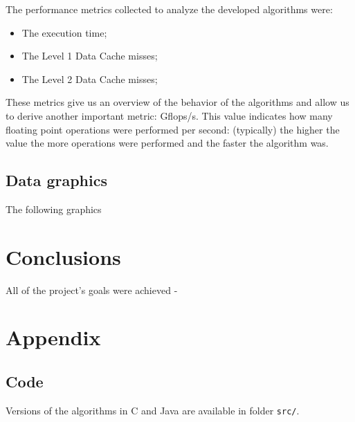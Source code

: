 \documentclass[11pt,a4paper]{article}
\begin{document}
The performance metrics collected to analyze the developed algorithms were:

\begin{itemize}
    \item The execution time;
    \item The Level 1 Data Cache misses;
    \item The Level 2 Data Cache misses;
\end{itemize}

These metrics give us an overview of the behavior of the algorithms and allow us to derive another important metric: Gflops/s. This value indicates how many floating point operations were performed per second: (typically) the higher the value the more operations were performed and the faster the algorithm was.

\subsection{Data graphics}

The following graphics


\section{Conclusions}

All of the project's goals were achieved -

\onecolumn
\appendix
\section{Appendix}

\subsection{Code}

\noindent Versions of the algorithms in C and Java are available in folder \lstinline{src/}.
\end{document}
